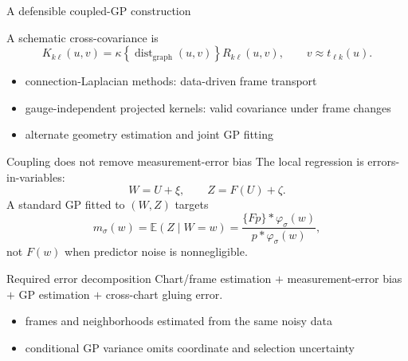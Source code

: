 \documentclass[aspectratio=169,10pt]{beamer}
\newcommand{\dist}{\operatorname{dist}}
\begin{document}
\begin{frame}{A defensible coupled-GP construction}
  \begin{center}
  \end{center}
  A schematic cross-covariance is
  \[
    K_{k\ell}(u,v)
      =\kappa\!\left\{\dist_{\mathrm{graph}}(u,v)\right\}
       R_{k\ell}(u,v),\qquad v\approx t_{\ell k}(u).
  \]
  \begin{itemize}
    \item connection-Laplacian methods: data-driven frame transport
    \item gauge-independent projected kernels: valid covariance under frame changes
    \item alternate geometry estimation and joint GP fitting
  \end{itemize}
\end{frame}

\begin{frame}{Coupling does not remove measurement-error bias}
  The local regression is errors-in-variables:
  \[
    W=U+\xi,\qquad Z=F(U)+\zeta.
  \]
  A standard GP fitted to \((W,Z)\) targets
  \[
    m_\sigma(w)=\mathbb E(Z\mid W=w)
      =\frac{\{Fp\}*\varphi_\sigma(w)}
             {p*\varphi_\sigma(w)},
  \]
  not \(F(w)\) when predictor noise is nonnegligible.
  \begin{alertblock}{Required error decomposition}
    Chart/frame estimation \(+\) measurement-error bias \(+\)
    GP estimation \(+\) cross-chart gluing error.
  \end{alertblock}
  \begin{itemize}
    \item frames and neighborhoods estimated from the same noisy data
    \item conditional GP variance omits coordinate and selection uncertainty
  \end{itemize}
\end{frame}
\end{document}

